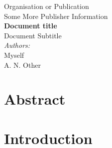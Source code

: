 \documentclass[a4paper, 11pt]{article}
\begin{document}
	
\begin{titlepage}
\begin{center}
	{\LARGE Organisation or Publication}\\[0.2cm]
	{\Large Some More Publisher Information}\\[1cm]
	{ \huge \bfseries Document title}\\[0.3cm]
	{ \large Document Subtitle}\\[0.7cm]
	\emph{Authors:}\\
	Myself\\
	A. N. Other\\[1.5cm]
\end{center}
\vfill
\section*{Abstract}
\lipsum[1]
\end{titlepage}

\section{Introduction}	
\lipsum
\end{document}
